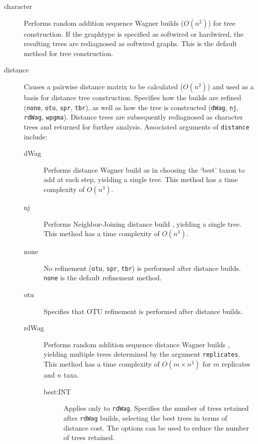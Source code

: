 \begin{description}
		\item [character] Performs random addition sequence Wagner \citep{Farris1970} builds 
		($O(n^2)$) for tree construction. If the graphtype is specified as softwired or hardwired, 
		the resulting trees are rediagnosed as softwired graphs. This is 
		the default method for tree construction.
		
		\item [distance] Causes a pairwise distance matrix to be calculated ($O(n^2)$) and used 
		as a basis for distance tree construction. Specifies how the builds are refined (\texttt{none}, 
		\texttt{otu}, \texttt{spr}, \texttt{tbr}), as well as how the tree is constructed (\texttt{dWag}, 
		\texttt{nj}, \texttt{rdWag}, \texttt{wpgma}). Distance trees are subsequently rediagnosed 
		as character trees and returned for further analysis. Associated arguments of \texttt{distance} 
		include:
					
		\begin{description}
			\item[dWag] Performs distance Wagner build as in \citep{Farris1972} choosing the 
			`best' taxon to 
			add at each step, yielding a single tree. This method has a time complexity of $O(n^3)$.

			\item[nj] Performs Neighbor-Joining distance build \citep{Saitou1987}, yielding a single 
			tree. This method has a time complexity of $O(n^3)$.

			\item[none] No refinement (\texttt{otu}, \texttt{spr}, \texttt{tbr}) is performed after 
			distance builds. \texttt{none} is the default refinement method.
						
			\item[otu] Specifies that OTU refinement \citep{Wheeler2021} is performed 
			after distance builds.
			
			\item[rdWag] Performs random addition sequence distance Wagner builds 
			\citep{Farris1972,Wheeler2021}, yielding multiple trees determined by the 
			argument \texttt{replicates}. This method has a time complexity of $O(m \times n^2)$
			for $m$ replicates and $n$ taxa.
			
				\begin{description}
				\item[best:INT] Applies only to \texttt{rdWag}. Specifies the number of trees retained 
				after 	\texttt{rdWag} builds, selecting the best trees in terms of distance cost. The 
				options can be used to reduce the number of trees retained.  
				\end{description}
			

\end{description}
\end{description}
